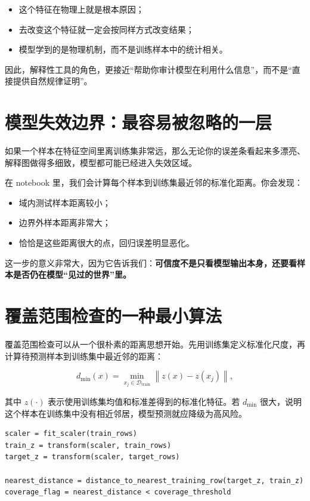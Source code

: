 \begin{itemize}
    \item 这个特征在物理上就是根本原因；
    \item 去改变这个特征就一定会按同样方式改变结果；
    \item 模型学到的是物理机制，而不是训练样本中的统计相关。
\end{itemize}

因此，解释性工具的角色，更接近“帮助你审计模型在利用什么信息”，而不是“直接提供自然规律证明”。

\section{模型失效边界：最容易被忽略的一层}

如果一个样本在特征空间里离训练集非常远，那么无论你的误差条看起来多漂亮、解释图做得多细致，模型都可能已经进入失效区域。

在 notebook 里，我们会计算每个样本到训练集最近邻的标准化距离。你会发现：

\begin{itemize}
    \item 域内测试样本距离较小；
    \item 边界外样本距离非常大；
    \item 恰恰是这些距离很大的点，回归误差明显恶化。
\end{itemize}

这一步的意义非常大，因为它告诉我们：\textbf{可信度不是只看模型输出本身，还要看样本是否仍在模型“见过的世界”里。}

\section{覆盖范围检查的一种最小算法}

覆盖范围检查可以从一个很朴素的距离思想开始。先用训练集定义标准化尺度，再计算待预测样本到训练集中最近邻的距离：

\[
d_{\min}(x)=\min_{x_j\in \mathcal{D}_{\mathrm{train}}}
\left\|z(x)-z(x_j)\right\|,
\]

其中 $z(\cdot)$ 表示使用训练集均值和标准差得到的标准化特征。若 $d_{\min}$ 很大，说明这个样本在训练集中没有相近邻居，模型预测就应降级为高风险。

\begin{examplebox}[覆盖范围检查骨架]
\begin{lstlisting}[style=pythonstyle]
scaler = fit_scaler(train_rows)
train_z = transform(scaler, train_rows)
target_z = transform(scaler, target_rows)

nearest_distance = distance_to_nearest_training_row(target_z, train_z)
coverage_flag = nearest_distance < coverage_threshold
\end{lstlisting}
\end{examplebox}

